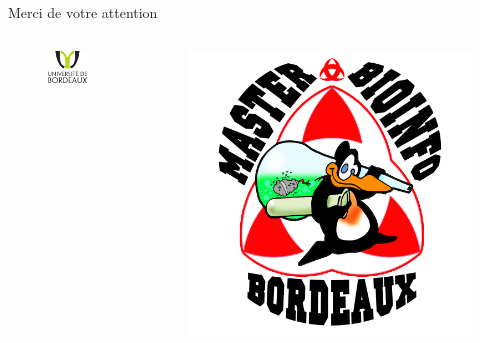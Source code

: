 \documentclass[12pt]{beamer}
\begin{document}
\begin{frame}
\begin{center}
{\LARGE Merci de votre attention\\ \textbf{}}
\begin{columns}
\begin{column}{5cm}
  \begin{figure}
   \begin{center}
    \includegraphics[scale=0.2]{img/bdx1.png}
   \end{center}
  \end{figure}
  \end{column}
  \begin{column}{5cm}
  \begin{figure}
   \begin{center}
    \includegraphics[scale=0.10]{img/logoMaster.png}


   	\end{center}
  \end{figure}
  \end{column}
\end{columns}
\end{center}
\end{frame}
\end{document}
